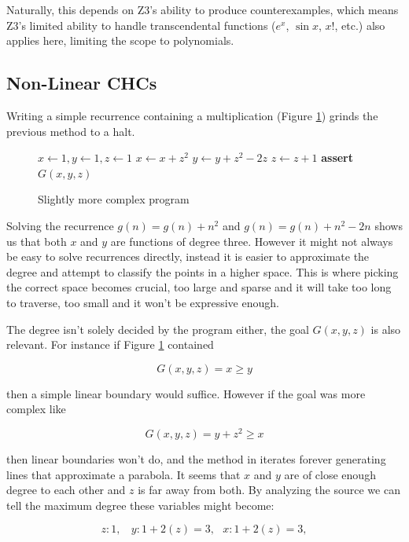 \documentclass[letterpaper,twocolumn,10pt]{article}
\begin{document}
Naturally, this depends on Z3's ability to produce counterexamples, which means
Z3's limited ability to handle transcendental functions ($e^x$, $\sin x$, $x!$,
etc.) also applies here, limiting the scope to polynomials.

\subsection{Non-Linear CHCs}

Writing a simple recurrence containing a multiplication (Figure \ref{fig:cubic})
grinds the previous method to a halt.

\begin{figure}[h]
\begin{algorithmic}
\State $x \gets 1, y \gets 1, z \gets 1$
\Loop
  \State $x \gets x + z^2$
  \State $y \gets y + z^2 - 2z$
  \State $z \gets z + 1$
\State \textbf{assert} $G(x, y, z)$
\EndLoop
\EndFunction
\end{algorithmic}
\caption{Slightly more complex program}
\label{fig:cubic}
\end{figure}

Solving the recurrence $g(n) = g(n) + n^2$ and $g(n) = g(n) + n^2 - 2n$ shows us
that both $x$ and $y$ are functions of degree three.
However it might not always be easy to solve recurrences directly, instead it is
easier to approximate the degree and attempt to classify the points in a higher
space. This is where picking the correct space becomes crucial, too large and
sparse and it will take too long to traverse, too small and it won't be
expressive enough.

The degree isn't solely decided by the program either, the goal $G(x, y, z)$ is
also relevant. For instance if Figure \ref{fig:cubic} contained

$$
G(x, y, z) = x \geq y
$$

then a simple linear boundary would suffice. However if the goal was more
complex like

$$
G(x, y, z) = y + z^2 \geq x
$$

then linear boundaries won't do, and the method in \cite{data-driven} iterates
forever generating lines that approximate a parabola.
It seems that $x$ and $y$ are of close enough degree to each other and $z$ is
far away from both. By analyzing the source we can tell the maximum degree these
variables might become:

$$
z: 1,~~~~ y: 1 + 2(z) = 3,~~~ x: 1 + 2(z) = 3, 
$$
\end{document}
